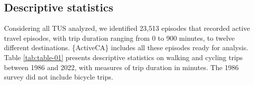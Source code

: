 \documentclass[Royal,times,sageh]{sagej}
\begin{document}
\begin{table}
\centering
\caption{\label{tab:gss-processed-file-2015}\label{tab:ep-2015-processed}Visualization of the active travel episode for the record number 10041 of the 2015 GSS survey.}
\centering
{}
\end{table}

\subsection{Descriptive statistics}\label{descriptive-statistics}

Considering all TUS analyzed, we identified 23,513 episodes that
recorded active travel episodes, with trip duration ranging from 0 to
900 minutes, to twelve different destinations. \{ActiveCA\} includes all
these episodes ready for analysis. Table \ref{tab:table-01} presents
descriptive statistics on walking and cycling trips between 1986 and
2022, with measures of trip duration in minutes. The 1986 survey did not
include bicycle trips.
\end{document}
